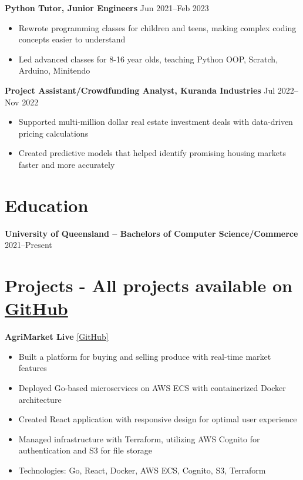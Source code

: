 \documentclass[10pt,a4paper]{article}
\begin{document}
	\textbf{Python Tutor, Junior Engineers} \hfill Jun 2021--Feb 2023 
	\begin{itemize}[label=\textbullet, itemsep=0.02cm]
		\item Rewrote programming classes for children and teens, making complex coding concepts easier to understand
		\item Led advanced classes for 8-16 year olds, teaching Python OOP, Scratch, Arduino, Minitendo
	\end{itemize}
	
	\textbf{Project Assistant/Crowdfunding Analyst, Kuranda Industries} \hfill Jul 2022--Nov 2022 
	\begin{itemize}[label=\textbullet, itemsep=0.02cm]
		\item Supported multi-million dollar real estate investment deals with data-driven pricing calculations 
		\item Created predictive models that helped identify promising housing markets faster and more accurately
	\end{itemize}
	
	\section{Education}
	\textbf{University of Queensland -- Bachelors of Computer Science/Commerce} \hfill 2021--Present \\	
	\section{Projects -  \textbf{All projects available on} \href{https://github.com/CameronBadman}{GitHub} }
	
	\textbf{AgriMarket Live} \href{https://github.com/CSSE6400/2025_P3_AgriMarket}{[GitHub]}
	\begin{itemize}[label=\textbullet, itemsep=0.05cm]
		\item Built a platform for buying and selling produce with real-time market features
		\item Deployed Go-based microservices on AWS ECS with containerized Docker architecture
		\item Created React application with responsive design for optimal user experience
		\item Managed infrastructure with Terraform, utilizing AWS Cognito for authentication and S3 for file storage
		\item Technologies: Go, React, Docker, AWS ECS, Cognito, S3, Terraform
	\end{itemize}
	
\end{document}
